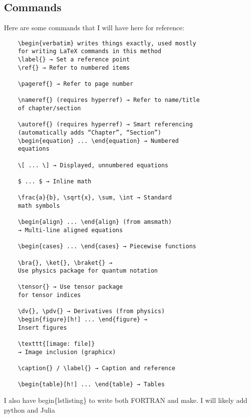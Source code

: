 \subsection{Commands}
Here are some commands that I will have here for reference:
\begin{verbatim}
    \begin{verbatim} writes things exactly, used mostly 
    for writing LaTeX commands in this method
    \label{} → Set a reference point
    \ref{} → Refer to numbered items

    \pageref{} → Refer to page number

    \nameref{} (requires hyperref) → Refer to name/title 
    of chapter/section

    \autoref{} (requires hyperref) → Smart referencing 
    (automatically adds “Chapter”, “Section”)
    \begin{equation} ... \end{equation} → Numbered 
    equations

    \[ ... \] → Displayed, unnumbered equations

    $ ... $ → Inline math

    \frac{a}{b}, \sqrt{x}, \sum, \int → Standard 
    math symbols

    \begin{align} ... \end{align} (from amsmath) 
    → Multi-line aligned equations

    \begin{cases} ... \end{cases} → Piecewise functions

    \bra{}, \ket{}, \braket{} → 
    Use physics package for quantum notation

    \tensor{} → Use tensor package 
    for tensor indices

    \dv{}, \pdv{} → Derivatives (from physics)
    \begin{figure}[h!] ... \end{figure} → 
    Insert figures

    \texttt{[image: file]}
    → Image inclusion (graphicx)

    \caption{} / \label{} → Caption and reference

    \begin{table}[h!] ... \end{table} → Tables
\end{verbatim}

I also have begin\{lstlisting\} to write both FORTRAN and make. I will likely add python and Julia
